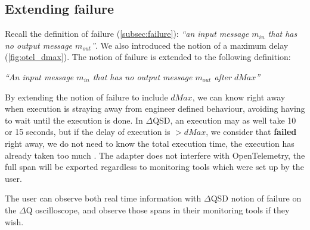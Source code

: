 \subsection{Extending failure}
   Recall the definition of failure (\cref{subsec:failure}): \textit{``an input message $m_{in}$ that has no output message $m_{out}$''}. We also introduced the notion of a maximum delay (\cref{fig:otel_dmax}). 
The notion of failure is extended to the following definition:
        \begin{center}
            \textit{``An input message $m_{in}$ that has no output message $m_{out}$ after $dMax$''} 
        \end{center}
   By extending the notion of failure to include $dMax$, we can know right away when execution is straying away from engineer defined behaviour, avoiding having to wait until the execution is done. In $\Delta$QSD, an execution may as well take 10 or 15 seconds, but if the delay of execution is $> dMax$, we consider that \textbf{failed} right away, we do not need to know the total execution time, the execution has already taken too much \cite{myo}. The adapter does not interfere with OpenTelemetry, the full span will be exported regardless to monitoring tools which were set up by the user. 

   The user can observe both real time information with $\Delta$QSD notion of failure on the $\Delta$Q oscilloscope, and observe those spans in their monitoring tools if they wish.

